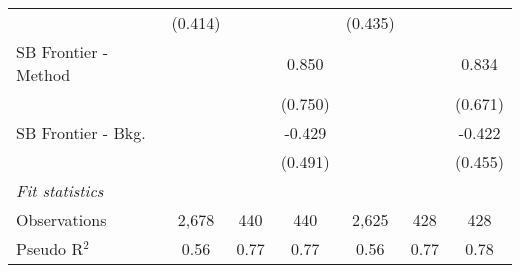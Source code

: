 \begin{tabular}{lcccccc}
                                & (0.414)       &                &                & (0.435)       &                &   \\   
   SB Frontier - Method         &               &                & 0.850          &               &                & 0.834\\   
                                &               &                & (0.750)        &               &                & (0.671)\\   
   SB Frontier - Bkg.           &               &                & -0.429         &               &                & -0.422\\   
                                &               &                & (0.491)        &               &                & (0.455)\\   
   \midrule
   \emph{Fit statistics}\\
   Observations                 & 2,678         & 440            & 440            & 2,625         & 428            & 428\\  
   Pseudo R$^2$                 & 0.56          & 0.77           & 0.77           & 0.56          & 0.77           & 0.78\\  
   

\end{tabular}
